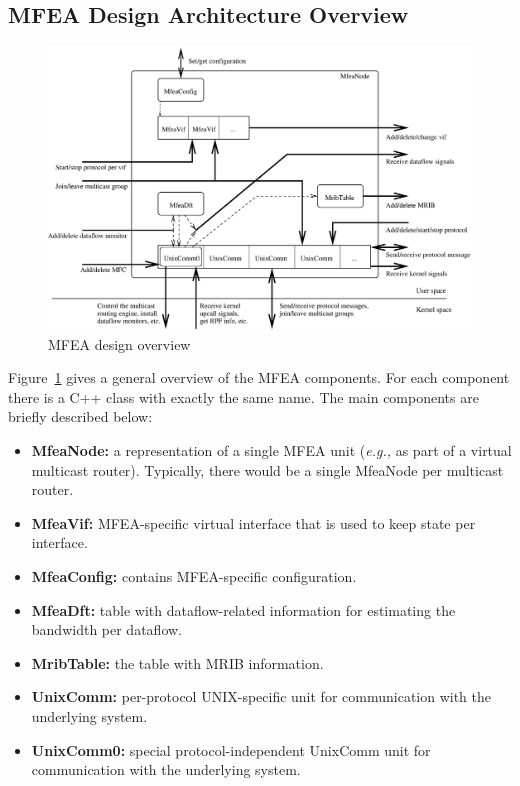 \documentclass[11pt]{article}
\newcommand{\eg}{\emph{e.g.,}\xspace}
\begin{document}
\subsection{MFEA Design Architecture Overview}

\begin{figure}[htbp]
  \begin{center}
    \includegraphics[scale=0.5]{figs/mfea_design_overview}
    \caption{MFEA design overview}
    \label{fig:mfea_design_overview}
  \end{center}
\end{figure}

Figure~\ref{fig:mfea_design_overview} gives a general overview of the
MFEA components. For each component there is a C++ class with exactly
the same name. The main components are briefly described below:

\begin{itemize}

  \item {\bf MfeaNode:} a representation of a single MFEA unit
  (\eg as part of a virtual multicast router).
  Typically, there would be a single MfeaNode per multicast router.

  \item {\bf MfeaVif:} MFEA-specific virtual interface that is used to keep
  state per interface.

  \item {\bf MfeaConfig:} contains MFEA-specific configuration.

  \item {\bf MfeaDft:} table with dataflow-related information for
  estimating the bandwidth per dataflow.

  \item {\bf MribTable:} the table with MRIB information.

  \item {\bf UnixComm:} per-protocol UNIX-specific unit for
  communication with the underlying system.

  \item {\bf UnixComm0:} special protocol-independent UnixComm unit for
  communication with the underlying system.

\end{itemize}
\end{document}
